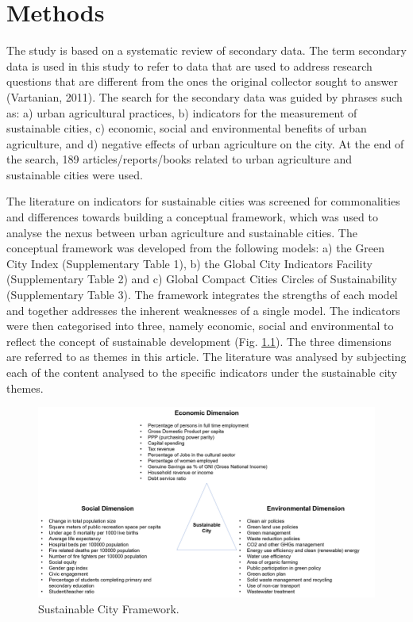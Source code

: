 \chapter{Methods} %

\label{Chapter:Methods}

The study is based on a systematic review of secondary data. The term secondary data is used in this study to refer to data that are used to address research questions that are different from the ones the original collector sought to answer (Vartanian, 2011). The search for the secondary data was guided by phrases such as: a) urban agricultural practices, b) indicators for the measurement of sustainable cities, c) economic, social and environmental benefits of urban agriculture, and d) negative effects of urban agriculture on the city. At the end of the search, 189 articles/reports/books related to urban agriculture and sustainable cities were used.

The literature on indicators for sustainable cities was screened for commonalities and differences towards building a conceptual framework, which was used to analyse the nexus between urban agriculture and sustainable cities. The conceptual framework was developed from the following models: a) the Green City Index (Supplementary Table 1), b) the Global City Indicators Facility (Supplementary Table 2) and c) Global Compact Cities Circles of Sustainability (Supplementary Table 3). The framework integrates the strengths of each model and together addresses the inherent weaknesses of a single model. The indicators were then categorised into three, namely economic, social and environmental to reflect the concept of sustainable development (Fig. \ref{fig:sustainableCityFramework}). The three dimensions are referred to as themes in this article. The literature was analysed by subjecting each of the content analysed to the specific indicators under the sustainable city themes.

\begin{figure}[th]
\centering
\includegraphics[width=1.00\textwidth]{./Figures/sustainableCityFramework.png}
\decoRule
\caption[Sustainable City Framework]{Sustainable City Framework.}
\label{fig:sustainableCityFramework}
\end{figure}

